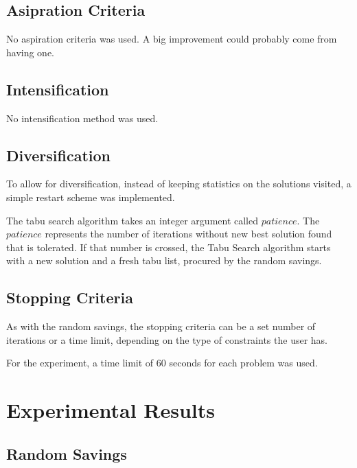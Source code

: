 \documentclass{article} %
\begin{document}
\subsection{Asipration Criteria}
No aspiration criteria was used. A big improvement could probably come from having one.


\subsection{Intensification}
No intensification method was used.


\subsection{Diversification}

To allow for diversification, instead of keeping statistics on the solutions visited, a simple restart scheme was implemented.\newline

The tabu search algorithm takes an integer argument called $patience$. The $patience$ represents the number of iterations without new best solution found that is tolerated. If that number is crossed, the Tabu Search algorithm starts with a new solution and a fresh tabu list, procured by the random savings.


\subsection{Stopping Criteria}

As with the random savings, the stopping criteria can be a set number of iterations or a time limit, depending on the type of constraints the user has.\newline

For the experiment, a time limit of 60 seconds for each problem was used.


\newpage
\section{Experimental Results}
\label{exp_results}

\subsection{Random Savings}
\end{document}
